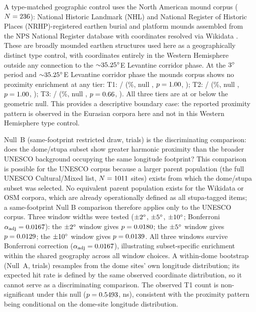 \documentclass[12pt,a4paper]{article}
\newcommand{\degr}{\ifmmode^\circ\else\textdegree{}\fi}
\begin{document}
A type-matched geographic control uses the North American mound corpus
($N = 236{}$): National Historic Landmark (NHL) and National
Register of Historic Places (NRHP)-registered earthen burial and
platform mounds assembled from the NPS National Register database with
coordinates resolved via Wikidata \citep{nps2024nrhp,wikidata2024}.
These are broadly mounded earthen structures used here as a geographically
distinct type control, with coordinates entirely in the Western Hemisphere outside
any connection to the ${\sim}35.25\degr$E Levantine corridor phase.
At the $3\degr$ period and ${\sim}35.25\degr$E Levantine corridor phase
the mounds corpus shows
no proximity enrichment at any tier:
T1: \moundsNApp{}/\moundsN{} (\moundsRateApp{}\%, null \NullRateApp{},
$p = 1.00{}$, \moundsPAppSig{});
T2: \moundsNAp{}/\moundsN{} (\moundsRateAp{}\%, null \NullRateAp{},
$p = 1.00{}$, \moundsPApSig{});
T3: \moundsNA{}/\moundsN{} (\moundsRateA{}\%, null \NullRateA{},
$p = 0.66{}$, \moundsPASig{}).
All three tiers are at or below the geometric null.
This provides a descriptive boundary case: the reported proximity
pattern is observed in the Eurasian corpora here and not in this Western
Hemisphere type control.

Null~B (same-footprint restricted draw, \simNperms{} trials) is the
discriminating comparison: does the dome/stupa subset show greater
harmonic proximity than the broader UNESCO background occupying the
same longitude footprint? This comparison is possible for the UNESCO
corpus because a larger parent population (the full UNESCO Cultural/Mixed
list, $N = 1011{}$ sites) exists from which the dome/stupa
subset was selected. No equivalent parent population exists for the
Wikidata or OSM corpora, which are already operationally defined as
all stupa-tagged items; a same-footprint Null B comparison therefore
applies only to the UNESCO corpus. Three window widths were tested
(${\pm}2\degr$, ${\pm}5\degr$, ${\pm}10\degr$; Bonferroni
$\alpha_\mathrm{adj} = 0.0167{}$): the ${\pm}2\degr$ window gives
$p = 0.0180{}$; the ${\pm}5\degr$ window gives
$p = 0.0129{}$; the ${\pm}10\degr$ window gives
$p = 0.0139{}$. All three windows survive
Bonferroni correction ($\alpha_\mathrm{adj} = 0.0167{}$),
illustrating subset-specific enrichment within the shared geography
across all window choices. A within-dome bootstrap (Null~A,
\simNperms{} trials) resamples from the dome sites' own longitude
distribution; its expected hit rate is defined by the same observed
coordinate distribution, so it cannot serve as a
discriminating comparison. The observed T1 count is non-significant
under this null ($p = 0.5493{}$, ns), consistent with the
proximity pattern being conditional on the dome-site longitude distribution.
\end{document}
